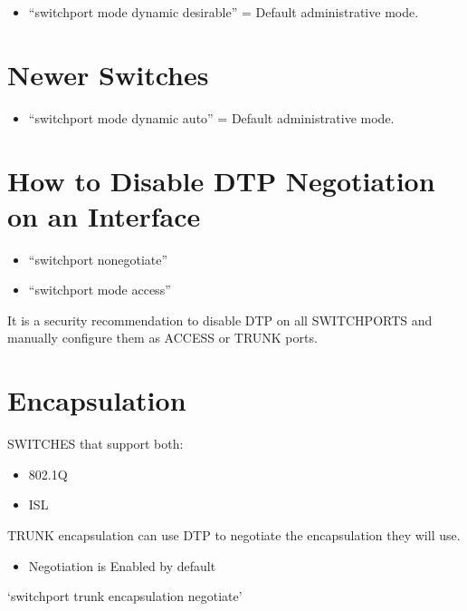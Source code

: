 \begin{itemize}
\tightlist
\item
  ``switchport mode dynamic desirable'' = Default administrative mode.
\end{itemize}

\section{Newer Switches}\label{newer-switches}

\begin{itemize}
\tightlist
\item
  ``switchport mode dynamic auto'' = Default administrative mode.
\end{itemize}

\section{How to Disable DTP Negotiation on an
Interface}\label{how-to-disable-dtp-negotiation-on-an-interface}

\begin{itemize}
\tightlist
\item
  ``switchport nonegotiate''
\item
  ``switchport mode access''
\end{itemize}

It is a security recommendation to disable DTP on all SWITCHPORTS and
manually configure them as ACCESS or TRUNK ports.

\section{Encapsulation}\label{encapsulation}

SWITCHES that support both:

\begin{itemize}
\tightlist
\item
  802.1Q
\item
  ISL
\end{itemize}

TRUNK encapsulation can use DTP to negotiate the encapsulation they will
use.

\begin{itemize}
\tightlist
\item
  Negotiation is Enabled by default
\end{itemize}

\begin{tipbox}

`switchport trunk encapsulation negotiate'

\end{tipbox}

